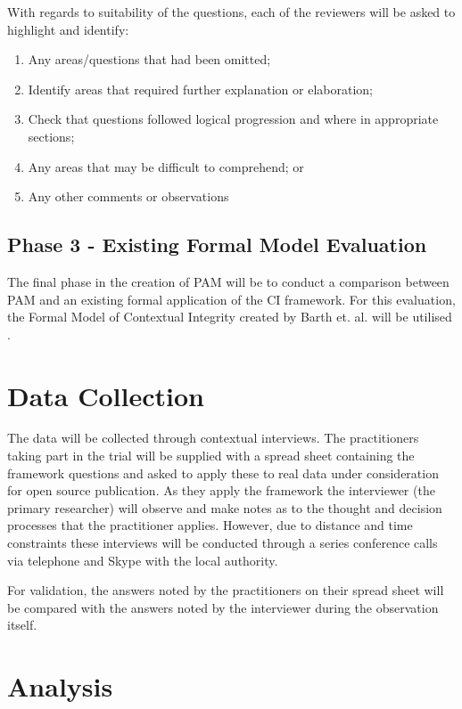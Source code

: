 With regards to suitability of the questions, each of the reviewers will be asked to highlight and identify:

\begin{enumerate}
\item Any areas/questions that had been omitted;
\item Identify areas that required further explanation or elaboration;
\item Check that questions followed logical progression and where in appropriate sections;
\item Any areas that may be difficult to comprehend; or
\item Any other comments or observations
\end{enumerate}

\subsection{Phase 3 - Existing Formal Model Evaluation}

The final phase in the creation of PAM will be to conduct a comparison between PAM and an existing formal application of the CI framework. For this evaluation, the Formal Model of Contextual Integrity created by  Barth et. al. will be utilised \cite{Barth2006184}.

\section {Data Collection}

The data will be collected through contextual interviews. The practitioners taking part in the trial will be supplied with a spread sheet containing the framework questions and asked to apply these to real data under consideration for open source publication. As they apply the framework the interviewer (the primary researcher) will observe and make notes as to the thought and decision processes that the practitioner applies. However, due to distance and time constraints these interviews will be conducted through a series conference calls via telephone and Skype  with the local authority.

For validation, the answers noted by the practitioners on their spread sheet will be compared with the answers noted by the interviewer during the observation itself.

\section {Analysis}

